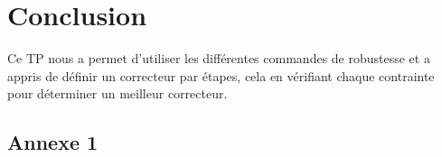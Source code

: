 \documentclass[12pt, a4paper, openany]{report}
\begin{document}


 


\chapter*{Conclusion}

Ce TP nous a permet d'utiliser les différentes commandes de robustesse et a appris de définir un correcteur par étapes, cela en vérifiant chaque contrainte pour déterminer un meilleur correcteur.\\










\begin{appendices}
\chapter*{Annexe 1}
	
				
\end{appendices}





%
%
\end{document}
